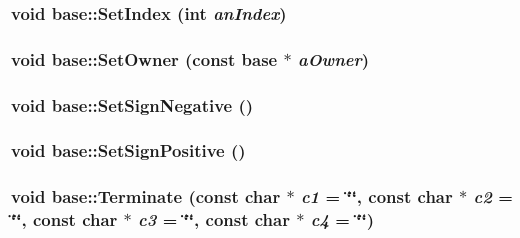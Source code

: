 \label{classbase_a3cb378050dc4ced8420f41dcd7292239}
\hypertarget{classbase_a0941fad0c59ce0c15d4846748092ba3a}{
\subsubsection[{SetIndex}]{\setlength{\rightskip}{0pt plus 5cm}void base::SetIndex (int {\em anIndex})}}
\label{classbase_a0941fad0c59ce0c15d4846748092ba3a}
\hypertarget{classbase_a42c446f0adea294e97a2486946b7cbc4}{
\subsubsection[{SetOwner}]{\setlength{\rightskip}{0pt plus 5cm}void base::SetOwner (const {\bf base} $\ast$ {\em aOwner})}}
\label{classbase_a42c446f0adea294e97a2486946b7cbc4}
\hypertarget{classbase_a34d7bbc86ce70c03d9af72b95d1943ce}{
\subsubsection[{SetSignNegative}]{\setlength{\rightskip}{0pt plus 5cm}void base::SetSignNegative ()}}
\label{classbase_a34d7bbc86ce70c03d9af72b95d1943ce}
\hypertarget{classbase_a3e3ad9f4d881b5f6714a9864dceedab3}{
\subsubsection[{SetSignPositive}]{\setlength{\rightskip}{0pt plus 5cm}void base::SetSignPositive ()}}
\label{classbase_a3e3ad9f4d881b5f6714a9864dceedab3}
\hypertarget{classbase_a32986c47c1ff0d162befc4a3830734f2}{
\subsubsection[{Terminate}]{\setlength{\rightskip}{0pt plus 5cm}void base::Terminate (const char $\ast$ {\em c1} = {\ttfamily \char`\"{}\char`\"{}}, \/  const char $\ast$ {\em c2} = {\ttfamily \char`\"{}\char`\"{}}, \/  const char $\ast$ {\em c3} = {\ttfamily \char`\"{}\char`\"{}}, \/  const char $\ast$ {\em c4} = {\ttfamily \char`\"{}\char`\"{}})}}
